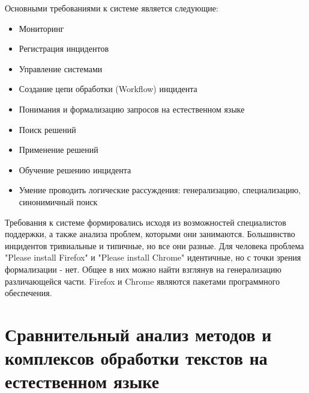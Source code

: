 Основными требованиями к системе является следующие:
\begin{itemize}
	\item Мониторинг
	\item Регистрация инцидентов
	\item Управление системами
	\item Создание цепи обработки (Workflow) инцидента
	\item Понимания и формализацию запросов на естественном языке
	\item Поиск решений
	\item Применение решений
	\item Обучение решению инцидента
	\item Умение проводить логические рассуждения: генерализацию, специализацию, синонимичный поиск
\end{itemize}

Требования к системе формировались исходя из возможностей специалистов поддержки, а также анализа проблем, которыми они занимаются. Большинство инцидентов тривиальные и типичные, но все они разные. Для человека проблема "Please install Firefox" и "Please install Chrome" идентичные, но с точки зрения формализации - нет. Общее в них можно найти взглянув на генерализацию различающейся части. Firefox и Chrome являются пакетами программного обеспечения.



\clearpage

\section{Сравнительный анализ методов и комплексов обработки текстов на естественном языке}


